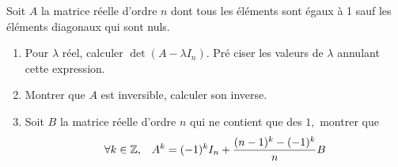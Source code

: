 Soit $A$ la matrice r{\'e}elle d'ordre $n$ dont tous les {\'e}l{\'e}ments sont
{\'e}gaux {\`a} 1 sauf les {\'e}l{\'e}ments diagonaux qui sont nuls.

\begin{enumerate}
\item  Pour $\lambda $ r{\'e}el, calculer $\det (A-\lambda I_{n}).$ Pr{\'e}%
ciser les valeurs de $\lambda $ annulant cette expression.

\item  Montrer que $A$ est inversible, calculer son inverse.

\item  Soit $B$ la matrice r{\'e}elle d'ordre $n$ qui ne contient que des $1,
$ montrer que
\[
\forall k\in \Bbb{Z}\text{,\quad }A^{k}=(-1)^{k}I_{n}+\frac{%
(n-1)^{k}-(-1)^{k}}{n}B
\]
\end{enumerate}
